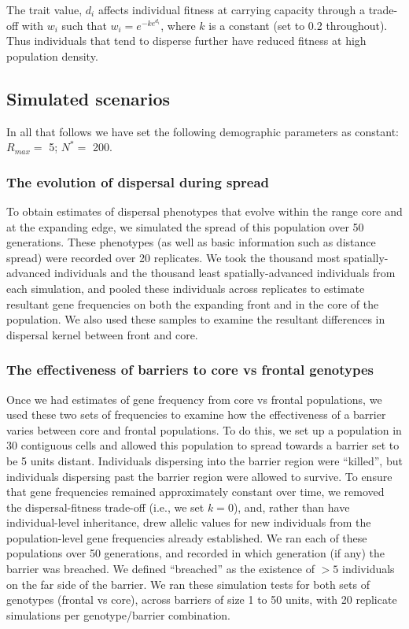 \documentclass{article}
\begin{document}
The trait value, \(d_i\) affects individual fitness at carrying capacity
through a trade-off with \(w_i\) such that \(w_i=e^{-ke^{d_i}}\), where $k$ is a constant (set to 0.2 throughout). Thus
individuals that tend to disperse further have reduced fitness at high
population density.

\subsection{Simulated scenarios}

In all that follows we have set the following demographic parameters as
constant: \(R_{max}=\) 5; \(N^*=\) 200.

\subsubsection{The evolution of dispersal during
spread}

To obtain estimates of dispersal phenotypes that evolve within the range
core and at the expanding edge, we simulated the spread of this
population over 50 generations. These phenotypes (as well as basic
information such as distance spread) were recorded over 20 replicates.
We took the thousand most spatially-advanced individuals and the
thousand least spatially-advanced individuals from each simulation, and
pooled these individuals across replicates to estimate resultant gene
frequencies on both the expanding front and in the core of the
population. We also used these samples to examine the resultant
differences in dispersal kernel between front and core.

\subsubsection{The effectiveness of barriers to core vs frontal
genotypes}

Once we had estimates of gene frequency from core vs frontal
populations, we used these two sets of frequencies to examine how the
effectiveness of a barrier varies between core and frontal populations.
To do this, we set up a population in 30 contiguous cells and allowed this population to spread towards a barrier set to be 5 units distant. Individuals dispersing into the barrier region were ``killed'', but individuals dispersing past the barrier region were allowed to survive. To ensure that gene frequencies remained approximately constant over time, we removed the dispersal-fitness trade-off (i.e., we set \(k=0\)), and, rather than have individual-level inheritance, drew allelic values for new individuals from the population-level gene frequencies already established. We ran each of these populations over 50 generations, and recorded in which generation (if any) the barrier was breached. We defined ``breached'' as the existence of \(>5\) individuals on the far side of the barrier. We ran these simulation tests for both sets of genotypes (frontal vs core), across barriers of size 1 to 50 units, with 20 replicate simulations per genotype/barrier combination.
\end{document}
